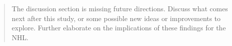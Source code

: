 \documentclass[12pt]{article}
\newenvironment{comment}%
{\begin{quotation}\noindent\small\it\ignorespaces%
  }{\end{quotation}}
\begin{document}
\begin{comment}
   The discussion section is missing future directions. Discuss what comes next after 
   this study, or some possible new ideas or improvements to explore. Further elaborate 
   on the implications of these findings for the NHL.
\end{comment}





\end{document}
